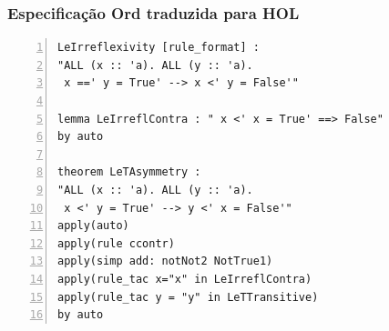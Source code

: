 \documentclass{beamer}
\newcommand{\HOL}{\textsc{HOL}\xspace}
\begin{document}
\begin{frame}[containsverbatim]
	\frametitle{Especificação Ord traduzida para \HOL}
	
\renewcommand{\FancyVerbFormatLine}[1]{%
	\ifthenelse{%
		\value{FancyVerbLine}<6%
		\or%
		\value{FancyVerbLine}>7%
		\and%
		\value{FancyVerbLine}<11%
	}{%
	 	\textcolor{red!60!black}{#1}%
	}{%
		\ifthenelse{%
			\value{FancyVerbLine}=6%
			\or%
			\value{FancyVerbLine}>10%
			\and%
			\value{FancyVerbLine}<17%
		}{%
		 	\textcolor{green!60!black}{#1}%
		}{%
			{#1}%
		}%
	}%
}

\begin{Verbatim}[numbers=left,numbersep=3pt]
LeIrreflexivity [rule_format] :
"ALL (x :: 'a). ALL (y :: 'a).
 x ==' y = True' --> x <' y = False'"

lemma LeIrreflContra : " x <' x = True' ==> False"
by auto

theorem LeTAsymmetry :
"ALL (x :: 'a). ALL (y :: 'a).
 x <' y = True' --> y <' x = False'"
apply(auto)
apply(rule ccontr)
apply(simp add: notNot2 NotTrue1)
apply(rule_tac x="x" in LeIrreflContra)
apply(rule_tac y = "y" in LeTTransitive)
by auto
\end{Verbatim}
\end{frame}
\end{document}
